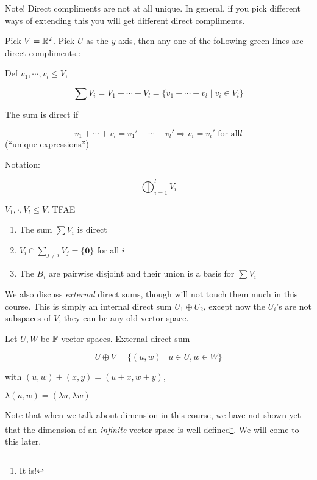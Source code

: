 \documentclass[a4paper]{article}
\begin{document}
Note! Direct compliments are not at all unique. In general, if you pick different ways of extending this you will get different direct compliments. 

Pick $ V = \mathbb{R}^{2} $. Pick $ U $ as the $ y $-axis, then any one of the following green lines are direct compliments.:

\begin{defi}
	Def $ v_{1},\cdots,v_{l} \leq V $,
	
	\[ \sum V_{i} = V_{1} + \cdots + V_{l} = \{  v_{1} + \cdots + v_{l} \; | \; v_{i} \in V_{i} \} \]
	
	The sum is direct if
	
	\[ v_{1} + \cdots + v_{l} = v_{1}' + \cdots + v_{l}' \Rightarrow v_{i} = v_{i}' \text{ for all} l \] (``unique expressions'')
	
	Notation:
	
	\[ \bigoplus_{i=1}^{l} V_{i} \]
\end{defi}
	
\begin{ex}
	$ V_{1},\cdot,V_{l} \leq V $. TFAE
	
	\begin{enumerate}
		\item The sum $ \sum V_{i} $ is direct
		\item $ V_{i} \cap \sum_{j \neq i}   V_{j} = \{ \mathbf{0} \} $ for all $ i $
		\item The $ B_{i} $ are pairwise disjoint and their union is a basis for  $ \sum V_{i}  $
		
	\end{enumerate}


\end{ex}


We also discuss \emph{external} direct sums, though will not touch them much in this course. This is simply an internal direct sum $ U_{1} \oplus U_{2} $, except now the $ U_{i} $'s are not subspaces of $ V $, they can be any old vector space. 


\begin{defi}
	Let $ U,W $ be $ \mathbb{F} $-vector spaces.
	External direct sum
	
	\[ U \oplus V  = \{  (u,w) \; | \; u \in U, w \in W \}\]
	
	with $ (u,w) + (x,y) = (u + x, w + y) $,
	
	$ \lambda(u,w) = (\lambda u, \lambda w) $
\end{defi}

Note that when we talk about dimension in this course, we have not shown yet that the dimension of an \emph{infinite} vector space is well defined\footnote{It is!}. We will come to this later.
\end{document}
